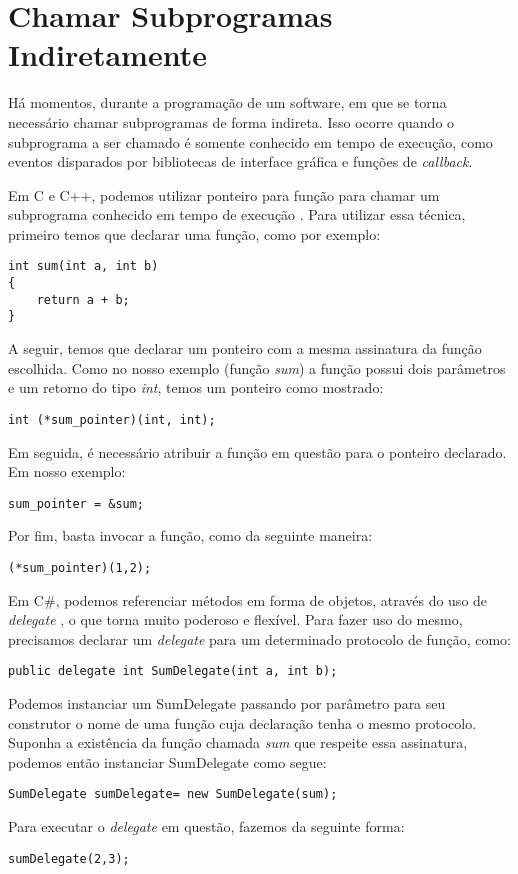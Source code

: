 \section{Chamar Subprogramas Indiretamente} %
\label{sec:chamar_subprogramas_indiretamente}
Há momentos, durante a programação de um software, em que se torna necessário chamar subprogramas de forma indireta. Isso ocorre quando o subprograma a ser chamado é somente conhecido em tempo de execução, como eventos disparados por bibliotecas de interface gráfica e funções de \textit{callback}.

Em C e C++, podemos utilizar ponteiro para função para chamar um subprograma conhecido em tempo de execução \cite{pointer,sebesta}. Para utilizar essa técnica, primeiro temos que declarar uma função, como por exemplo:
\begin{verbatim}
int sum(int a, int b)
{
    return a + b;
}
\end{verbatim}

A seguir, temos que declarar um ponteiro com a mesma assinatura da função escolhida. Como no nosso exemplo (função \textit{sum}) a função possui dois parâmetros e um retorno do tipo \emph{int}, temos um ponteiro como mostrado:
\begin{verbatim}
int (*sum_pointer)(int, int);
\end{verbatim}

Em seguida, é necessário atribuir a função em questão para o ponteiro declarado. Em nosso exemplo:
\begin{verbatim}
sum_pointer = &sum;
\end{verbatim}

Por fim, basta invocar a função, como da seguinte maneira:
\begin{verbatim}
(*sum_pointer)(1,2);	
\end{verbatim}

Em C\#, podemos referenciar métodos em forma de objetos, através do uso de \emph{delegate} \cite{delegate,sebesta}, o que torna muito poderoso e flexível. Para fazer uso do mesmo, precisamos declarar um \emph{delegate} para um determinado protocolo de função, como:
\begin{verbatim}
public delegate int SumDelegate(int a, int b);
\end{verbatim}

Podemos instanciar um SumDelegate passando por parâmetro para seu construtor o nome de uma função cuja declaração tenha o mesmo protocolo. Suponha a existência da função chamada \textit{sum} que respeite essa assinatura, podemos então instanciar SumDelegate como segue:
\begin{verbatim}
SumDelegate sumDelegate= new SumDelegate(sum);
\end{verbatim}

Para executar o \textit{delegate} em questão, fazemos da seguinte forma:
\begin{verbatim}
sumDelegate(2,3);
\end{verbatim}
